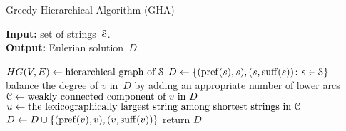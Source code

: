 \begin{algorithm}[!ht]
\caption{Greedy Hierarchical Algorithm (GHA)}\label{algo:gha}
\hspace*{\algorithmicindent} \textbf{Input:} set of strings~${\cal S}$.\\
\hspace*{\algorithmicindent} \textbf{Output:} Eulerian solution~$D$.
\begin{algorithmic}[1]
\State $HG(V,E) \gets \text{hierarchical graph of ${\cal S}$}$ 
\State\label{alg:gha_init}$D \gets \{(\operatorname{pref}(s), s), (s, \operatorname{suff}(s)) \colon s \in {\cal S}\}$
\label{alg:for}
\State\label{alg:step6} balance the degree of $v$ in~$D$ by adding an appropriate number of lower arcs
\Else
\State\label{alg:else} ${\cal C} \gets \text{weakly connected component of $v$ in $D$}$
\State $u \gets \text{the lexicographically largest string among shortest strings in ${\cal C}$}$
\State\label{alg:last} $D \gets D \cup \{(\operatorname{pref}(v), v), (v, \operatorname{suff}(v))\}$
\EndIf
\EndIf
\EndFor
\EndFor
\State return $D$
\end{algorithmic}
\end{algorithm}

